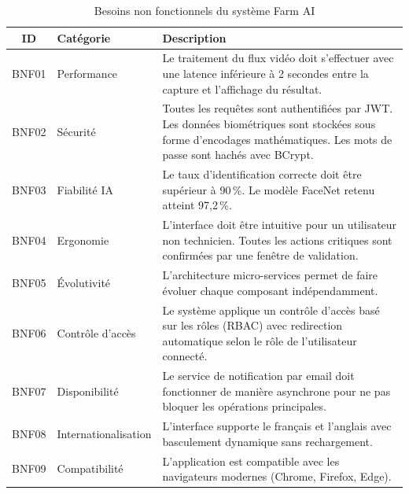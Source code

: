 \begin{table}[H]
  \centering
  \caption{Besoins non fonctionnels du système Farm AI}
  \label{tab:besoins_non_fonctionnels}
  \renewcommand{\arraystretch}{1.4}
  \begin{tabularx}{\textwidth}{|c|l|X|}
    \hline
    \rowcolor{gray!20}
    \textbf{ID} & \textbf{Catégorie} & \textbf{Description} \\
    \hline
    BNF01 & Performance &
      Le traitement du flux vidéo doit s'effectuer avec une latence inférieure à 2 secondes entre la capture et l'affichage du résultat. \\
    \hline
    BNF02 & Sécurité &
      Toutes les requêtes sont authentifiées par JWT. Les données biométriques sont stockées sous forme d'encodages mathématiques. Les mots de passe sont hachés avec BCrypt. \\
    \hline
    BNF03 & Fiabilité IA &
      Le taux d'identification correcte doit être supérieur à 90\,\%. Le modèle FaceNet retenu atteint 97,2\,\%. \\
    \hline
    BNF04 & Ergonomie &
      L'interface doit être intuitive pour un utilisateur non technicien. Toutes les actions critiques sont confirmées par une fenêtre de validation. \\
    \hline
    BNF05 & Évolutivité &
      L'architecture micro-services permet de faire évoluer chaque composant indépendamment. \\
    \hline
    BNF06 & Contrôle d'accès &
      Le système applique un contrôle d'accès basé sur les rôles (RBAC) avec redirection automatique selon le rôle de l'utilisateur connecté. \\
    \hline
    BNF07 & Disponibilité &
      Le service de notification par email doit fonctionner de manière asynchrone pour ne pas bloquer les opérations principales. \\
    \hline
    BNF08 & Internationalisation &
      L'interface supporte le français et l'anglais avec basculement dynamique sans rechargement. \\
    \hline
    BNF09 & Compatibilité &
      L'application est compatible avec les navigateurs modernes (Chrome, Firefox, Edge). \\
    \hline
  \end{tabularx}
\end{table}


